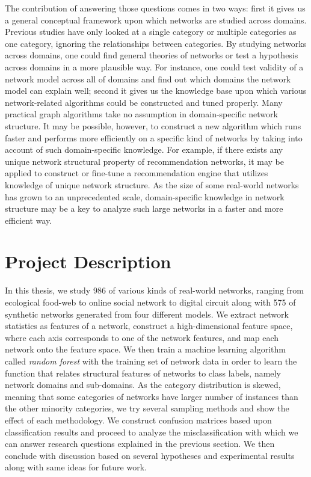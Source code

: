 The contribution of answering those questions comes in two ways: first it gives us a general conceptual framework upon which networks are studied across domains. Previous studies have only looked at a single category or multiple categories as one category, ignoring the relationships between categories. By studying networks across domains, one could find general theories of networks or test a hypothesis across domains in a more plausible way.  For instance, one could test validity of a network model across all of domains and find out which domains the network model can explain well; second it gives us the knowledge base upon which various network-related algorithms could be constructed and tuned properly.  Many practical graph algorithms take no assumption in domain-specific network structure. It may be possible, however, to construct a new algorithm which runs faster and performs more efficiently on a specific kind of networks by taking into account of such domain-specific knowledge. For example, if there exists any unique network structural property of recommendation networks,  it may be applied to construct or fine-tune a recommendation engine that utilizes knowledge of unique network structure. As the size of some real-world networks has grown to an unprecedented scale, domain-specific knowledge in network structure may be a key to analyze such large networks in a faster and more efficient way.

\section{Project Description}

In this thesis, we study 986 of various kinds of real-world networks, ranging from ecological food-web to online social network to digital circuit along with 575 of synthetic networks generated from four different models. We extract network statistics as features of a network, construct a high-dimensional feature space, where each axis corresponds to one of the network features, and map each network onto the feature space. We then train a machine learning algorithm called \textit{random forest} with the training set of network data in order to learn the function that relates structural features of networks to class labels, namely network domains and sub-domains. As the category distribution is skewed, meaning that some categories of networks have larger number of instances than the other minority categories, we try several sampling methods and show the effect of each methodology. We construct confusion matrices based upon classification results and proceed to analyze the misclassification with which we can answer research questions explained in the previous section. We then conclude with discussion based on several hypotheses and experimental results along with same ideas for future work.
